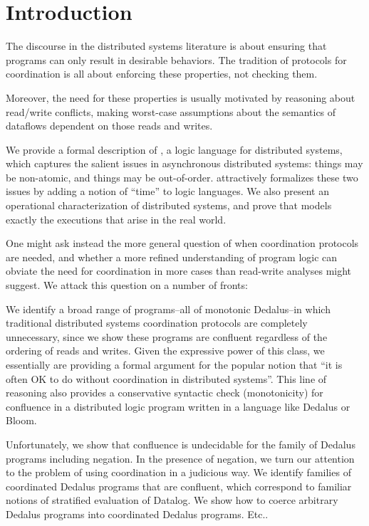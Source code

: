 \section{Introduction}

The discourse in the distributed systems literature is about ensuring that programs can only result in desirable behaviors.  The tradition of protocols for coordination is all about enforcing these properties, not checking them.

Moreover, the need for these properties is usually motivated by reasoning about
read/write conflicts, making worst-case assumptions about the semantics of dataflows
dependent on those reads and writes.  

We provide a formal description of \lang, a logic language for distributed systems, which captures the salient issues in asynchronous distributed systems: things may be non-atomic, and things may be out-of-order.  \lang attractively formalizes these two issues by adding a notion of ``time'' to logic languages.  We also present an operational characterization of distributed systems, and prove that \lang models exactly the executions that arise in the real world.

One might ask instead the more general question of when coordination protocols are
needed, and whether a more refined understanding of program logic can obviate the need
for coordination in more cases than read-write analyses might suggest.  We attack this
question on a number of fronts:

We identify a broad range of programs--all of monotonic Dedalus--in which traditional
distributed systems coordination protocols are completely unnecessary, since we show
these programs are confluent regardless of the ordering of reads and writes. Given the
expressive power of this class, we essentially are providing a formal argument for the
popular notion that ``it is often OK to do without coordination in distributed systems''. This line of reasoning also provides a conservative syntactic  check (monotonicity) for confluence in a distributed logic program written in a language like Dedalus or Bloom.

Unfortunately, we show that confluence is undecidable for the family of Dedalus
programs including negation.  In the presence of negation, we turn our attention to the
problem of using coordination in a judicious way.  We identify families of coordinated
Dedalus programs that are confluent, which correspond to familiar notions of stratified
evaluation of Datalog.  We show how to coerce arbitrary Dedalus programs into
coordinated Dedalus programs.  Etc..
